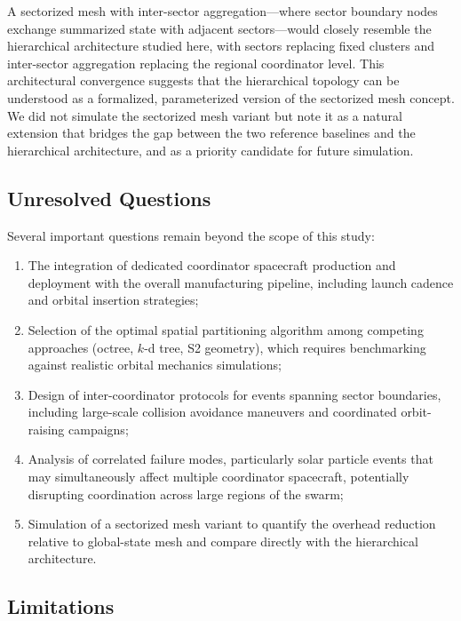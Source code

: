 \documentclass[journal]{IEEEtran}
\begin{document}
A sectorized mesh with inter-sector aggregation---where sector boundary nodes exchange summarized state with adjacent sectors---would closely resemble the hierarchical architecture studied here, with sectors replacing fixed clusters and inter-sector aggregation replacing the regional coordinator level. This architectural convergence suggests that the hierarchical topology can be understood as a formalized, parameterized version of the sectorized mesh concept. We did not simulate the sectorized mesh variant but note it as a natural extension that bridges the gap between the two reference baselines and the hierarchical architecture, and as a priority candidate for future simulation.

\subsection{Unresolved Questions}

Several important questions remain beyond the scope of this study:

\begin{enumerate}
    \item The integration of dedicated coordinator spacecraft production and deployment with the overall manufacturing pipeline, including launch cadence and orbital insertion strategies;
    \item Selection of the optimal spatial partitioning algorithm among competing approaches (octree, $k$-d tree, S2 geometry), which requires benchmarking against realistic orbital mechanics simulations;
    \item Design of inter-coordinator protocols for events spanning sector boundaries, including large-scale collision avoidance maneuvers and coordinated orbit-raising campaigns;
    \item Analysis of correlated failure modes, particularly solar particle events that may simultaneously affect multiple coordinator spacecraft, potentially disrupting coordination across large regions of the swarm;
    \item Simulation of a sectorized mesh variant to quantify the overhead reduction relative to global-state mesh and compare directly with the hierarchical architecture.
\end{enumerate}

\subsection{Limitations}
\end{document}
